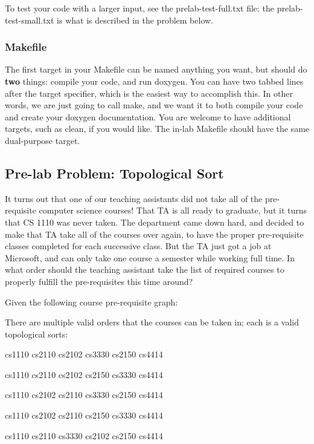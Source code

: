To test your code with a larger input, see the prelab-\/test-\/full.\+txt file; the prelab-\/test-\/small.\+txt is what is described in the problem below.

\subsubsection*{Makefile}

The first target in your Makefile can be named anything you want, but should do {\bfseries two} things\+: compile your code, and run doxygen. You can have two tabbed lines after the target specifier, which is the easiest way to accomplish this. In other words, we are just going to call {\ttfamily make}, and we want it to both compile your code and create your doxygen documentation. You are welcome to have additional targets, such as {\ttfamily clean}, if you would like. The in-\/lab Makefile should have the same dual-\/purpose target. 



\subsection*{Pre-\/lab Problem\+: Topological Sort }

It turns out that one of our teaching assistants did not take all of the pre-\/requisite computer science courses! That TA is all ready to graduate, but it turns that CS 1110 was never taken. The department came down hard, and decided to make that TA take all of the courses over again, to have the proper pre-\/requisite classes completed for each successive class. But the TA just got a job at Microsoft, and can only take one course a semester while working full time. In what order should the teaching assistant take the list of required courses to properly fulfill the pre-\/requisites this time around?

Given the following course pre-\/requisite graph\+:



There are multiple valid orders that the courses can be taken in; each is a valid topological sorts\+:


\begin{DoxyItemize}
\item cs1110 cs2110 cs2102 cs3330 cs2150 cs4414
\item cs1110 cs2110 cs2102 cs2150 cs3330 cs4414
\item cs1110 cs2102 cs2110 cs3330 cs2150 cs4414
\item cs1110 cs2102 cs2110 cs2150 cs3330 cs4414
\item cs1110 cs2110 cs3330 cs2102 cs2150 cs4414
\end{DoxyItemize}

